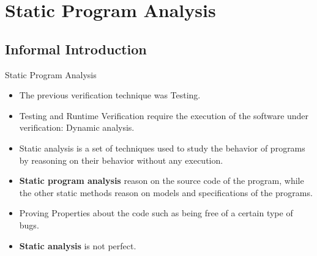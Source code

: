 \chapter{Static Program Analysis}
\label{chap_static}

\section{Informal Introduction}

\begin{frame}{Static Program Analysis}
\begin{itemize}
  \item The previous verification technique was Testing.
  \item Testing and Runtime Verification require the execution of the software under verification: Dynamic analysis.
  \item Static analysis is a set of techniques used to study the behavior of programs by reasoning on their behavior without any execution.
  \item \textbf{Static program analysis} reason on the source code of the program, while the other static methods reason on models and specifications of the programs.
  \item Proving Properties about the code such as being free of a certain type of bugs.
  \item \textbf{Static analysis} is not perfect. 
\end{itemize}
\end{frame}

